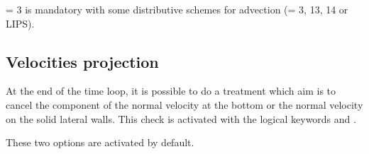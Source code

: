  = 3 is mandatory with some distributive schemes
for advection (= 3, 13, 14 or LIPS).

\subsection{Velocities projection}

At the end of the time loop, it is possible to do a treatment which aim is to
cancel the component of the normal velocity at the bottom or the normal
velocity on the solid lateral walls. This check is activated with the logical
keywords  and
.

These two options are activated by default.
